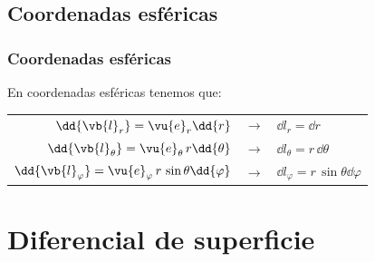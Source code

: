 \subsection*{Coordenadas esféricas}
\begin{frame}
\frametitle{Coordenadas esféricas}
En coordenadas esféricas tenemos que:
\begin{table}
\begin{tabular}{r  c  l}
$\dd{\vb{l}_{r}} = \vu{e}_{r} \dd{r}$ & $\longrightarrow$ & $\dd{l_{r}} = \dd{r}$ \\
$\dd{\vb{l}_{\theta}} = \vu{e}_{\theta} \, r \dd{\theta}$ & $\longrightarrow$ & $\dd{l_{\theta}} = r \, \dd{\theta}$ \\
$\dd{\vb{l}_{\varphi}} = \vu{e}_{\varphi} \, r \, \sin \theta \dd{\varphi}$ & $\longrightarrow$ & $\dd{l_{\varphi}} = r \, \sin \theta \dd{\varphi}$ \\
\end{tabular}
\end{table}
\end{frame}
\section{Diferencial de superficie}
